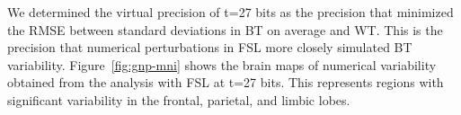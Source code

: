 \documentclass[conference]{IEEEtran}
\begin{document}
We determined the virtual precision of t=27 bits as the precision that minimized the RMSE between standard deviations in BT on average and WT.
This is the precision that numerical perturbations in FSL more closely simulated BT variability.
Figure~\ref{fig:gnp-mni} shows the brain maps of numerical variability obtained from the analysis with FSL at t=27 bits.
This represents regions with significant variability in the frontal, parietal, and limbic lobes.

  \begin{figure}[ht]
  \end{figure}
\end{document}
